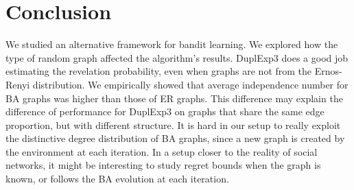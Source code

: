 \documentclass[10pt,a4paper]{scrartcl}
\begin{document}
\section{Conclusion}
We studied an alternative framework for bandit learning. We explored how the type of random graph affected the algorithm's results. DuplExp3 does a good job estimating the revelation probability, even when graphs are not from the Ernos-Renyi distribution. We empirically showed that average independence number for BA graphs was higher than those of ER graphs. This difference may explain the difference of performance for DuplExp3 on graphs that share the same edge proportion, but with different structure. It is hard in our setup to really exploit the distinctive degree distribution of BA graphs, since a new graph is created by the environment at each iteration. In a setup closer to the reality of social networks, it might be interesting to study regret bounds when the graph is known, or follows the BA evolution at each iteration. 



\end{document}
